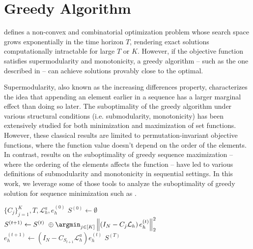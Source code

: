 \documentclass{article} %
\begin{document}

\section{Greedy Algorithm} \label{sec:greedy}

 defines a non-convex and combinatorial optimization problem whose search space grows exponentially in the time horizon $T$, rendering exact solutions computationally intractable for large $T$ or $K$. However, if the objective function satisfies supermodularity and monotonicity, a greedy algorithm -- such as the one described in  -- can achieve solutions provably close to the optimal.


Supermodularity, also known as the increasing differences property, characterizes the idea that appending an element earlier in a sequence has a larger marginal effect than doing so later. The suboptimality of the greedy algorithm under various structural conditions (i.e. submodularity, monotonicity) has been extensively studied for both minimization \citep{liberty2017greedy,bounia2023approximating}  and maximization \citep{nemhauser1978analysis,das2018approximate,feige2011maximizing,bian2017guarantees,harshaw2019submodular} of set functions. However, these classical results are limited to permutation-invariant objective functions, where the function value doesn't depend on the order of the elements. In contrast, results on the suboptimality of greedy sequence maximization \citep{streeter2008online,alaei2021maximizing,zhang2015string,bernardini2020through,van2024performance,tschiatschek2017selecting} -- where the ordering of the elements affects the function -- have led to various definitions of submodularity and monotonicity in sequential settings. In this work, we leverage some of those tools to analyze the suboptimality of greedy solution for sequence minimization such as .

\begin{algorithm} 
\caption{Greedy Algorithm}\label{alg:greedy}
\begin{algorithmic}
\Require $\{C_{j}\}_{j = 1}^{K}, T, \mathcal{L}_h^a, e^{(0)}_h$
\State $S^{(0)} \gets \emptyset$
    \State $S^{(t + 1)} \gets S^{(t)} \ \oplus \argmin_{j \in [K]}\left\|\left( I_N - C_{j} \mathcal{L}_{h}\right)e^{(t)}_h\right\|^2_2$
    \State $e^{(t + 1)}_h \gets \left(I_N - C_{S_{t+ 1}} \mathcal{L}_{h}^a\right)e^{(t)}_h$
\EndFor
\State \Return $S^{(T)}$
\end{algorithmic}
\end{algorithm}
\end{document}
